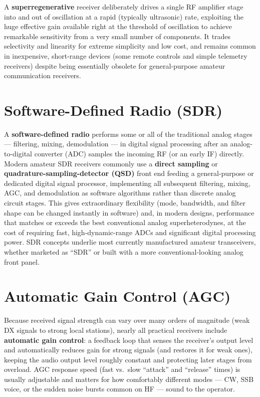 A \textbf{superregenerative} receiver deliberately drives a single RF
amplifier stage into and out of oscillation at a rapid (typically
ultrasonic) rate, exploiting the huge effective gain available right at
the threshold of oscillation to achieve remarkable sensitivity from a
very small number of components. It trades selectivity and
linearity for extreme simplicity and low cost, and remains common in
inexpensive, short-range devices (some remote controls and simple
telemetry receivers) despite being essentially obsolete for
general-purpose amateur communication receivers.

\section{Software-Defined Radio (SDR)}

A \textbf{software-defined radio} performs some or all of the
traditional analog stages --- filtering, mixing, demodulation --- in
digital signal processing after an analog-to-digital converter (ADC)
samples the incoming RF (or an early IF) directly. Modern amateur SDR
receivers commonly use a \textbf{direct sampling} or
\textbf{quadrature-sampling-detector (QSD)} front end feeding a
general-purpose or dedicated digital signal processor, implementing all
subsequent filtering, mixing, AGC, and demodulation as software
algorithms rather than discrete analog circuit stages. This gives
extraordinary flexibility (mode, bandwidth, and filter shape can be
changed instantly in software) and, in modern designs, performance that
matches or exceeds the best conventional analog superheterodynes, at the
cost of requiring fast, high-dynamic-range ADCs and significant digital
processing power. SDR concepts underlie most currently manufactured
amateur transceivers, whether marketed as ``SDR'' or built with a more
conventional-looking analog front panel.

\section{Automatic Gain Control (AGC)}

Because received signal strength can vary over many orders of magnitude
(weak DX signals to strong local stations), nearly all practical
receivers include \textbf{automatic gain control}: a feedback loop that
senses the receiver's output level and automatically reduces gain for
strong signals (and restores it for weak ones), keeping the audio output
level roughly constant and protecting later stages from overload. AGC
response speed (fast vs.\ slow ``attack'' and ``release'' times) is
usually adjustable and matters for how comfortably different modes ---
CW, SSB voice, or the sudden noise bursts common on HF --- sound to the
operator.

